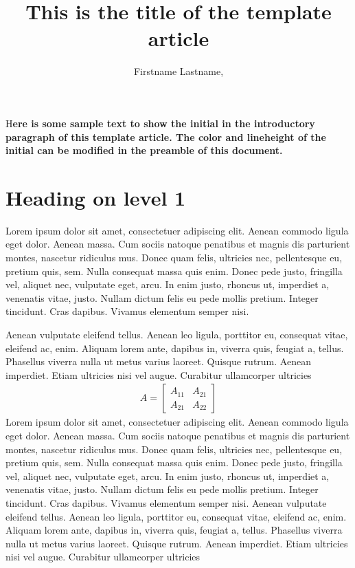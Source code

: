 \documentclass[	DIV=calc,%
							paper=a4,%
							fontsize=11pt,%
							twocolumn]{scrartcl}	 					%
\title{This is the title of the template article}					%
\author{Firstname Lastname, }											%
\date{}																				%
\newcommand{\initial}[1]{%
     \lettrine[lines=3,lhang=0.3,nindent=0em]{
     				\color{DarkGoldenrod}
     				{\textsf{#1}}}{}}
\begin{document}
\maketitle
\thispagestyle{fancy} 			%
\initial{H}\textbf{ere is some sample text to show the initial in the introductory paragraph of this template article. The color and lineheight of the initial can be modified in the preamble of this document.}

\section*{Heading on level 1}
Lorem ipsum dolor sit amet, consectetuer adipiscing elit. Aenean commodo ligula eget dolor. Aenean massa. Cum sociis natoque penatibus et magnis dis parturient montes, nascetur ridiculus mus. Donec quam felis, ultricies nec, pellentesque eu, pretium quis, sem. Nulla consequat massa quis enim. Donec pede justo, fringilla vel, aliquet nec, vulputate eget, arcu. In enim justo, rhoncus ut, imperdiet a, venenatis vitae, justo. Nullam dictum felis eu pede mollis pretium. Integer tincidunt. Cras dapibus. Vivamus elementum semper nisi. 

Aenean vulputate eleifend tellus. Aenean leo ligula, porttitor eu, consequat vitae, eleifend ac, enim. Aliquam lorem ante, dapibus in, viverra quis, feugiat a, tellus. Phasellus viverra nulla ut metus varius laoreet. Quisque rutrum. Aenean imperdiet. Etiam ultricies nisi vel augue. Curabitur ullamcorper ultricies 
\begin{align}
	A = 
	\begin{bmatrix}
	A_{11} & A_{21} \\
  	A_{21} & A_{22}
	\end{bmatrix}
\end{align}
Lorem ipsum dolor sit amet, consectetuer adipiscing elit. Aenean commodo ligula eget dolor. Aenean massa. Cum sociis natoque penatibus et magnis dis parturient montes, nascetur ridiculus mus. Donec quam felis, ultricies nec, pellentesque eu, pretium quis, sem. Nulla consequat massa quis enim. Donec pede justo, fringilla vel, aliquet nec, vulputate eget, arcu. In enim justo, rhoncus ut, imperdiet a, venenatis vitae, justo. Nullam dictum felis eu pede mollis pretium. Integer tincidunt. Cras dapibus. Vivamus elementum semper nisi. Aenean vulputate eleifend tellus. Aenean leo ligula, porttitor eu, consequat vitae, eleifend ac, enim. Aliquam lorem ante, dapibus in, viverra quis, feugiat a, tellus. Phasellus viverra nulla ut metus varius laoreet. Quisque rutrum. Aenean imperdiet. Etiam ultricies nisi vel augue. Curabitur ullamcorper ultricies 
\end{document}

